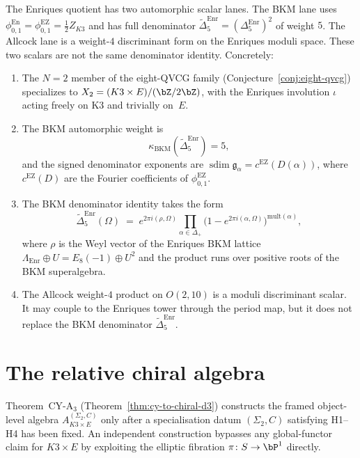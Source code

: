 \begin{conjecture}
\label{conj:enriques-qvcg}
The Enriques quotient has two automorphic scalar lanes. The BKM lane
uses
\(\phi^{\mathrm{En}}_{0,1}=\phi^{\mathrm{EZ}}_{0,1}=\frac12 Z_{K3}\)
and has full denominator
\(\widetilde\Delta^{\mathrm{Enr}}_5=(\Delta^{\mathrm{Enr}}_5)^2\) of
weight \(5\). The Allcock lane is a weight-\(4\) discriminant form on
the Enriques moduli space. These two scalars are not the same
denominator identity. Concretely:
\begin{enumerate}[label=\textup{(\roman*)}]
\item
The $N = 2$ member of the eight-QVCG family
(Conjecture~\textup{\ref{conj:eight-qvcg}}) specializes to
$X_2 = (K3 \times E)/(\bZ/2\bZ)$, with the Enriques involution
$\iota$ acting freely on K3 and trivially on~$E$.
\item
The BKM automorphic weight is
\[
 \kappa_{\mathrm{BKM}}(\widetilde\Delta^{\mathrm{Enr}}_5)=5,
\]
and the signed denominator exponents are
$\operatorname{sdim}\mathfrak g_\alpha
= c^{\mathrm{EZ}}(D(\alpha))$, where \(c^{\mathrm{EZ}}(D)\) are the
Fourier coefficients of \(\phi^{\mathrm{EZ}}_{0,1}\).
\item
The BKM denominator identity takes the form
\[
\widetilde\Delta^{\mathrm{Enr}}_5(\Omega)
\;=\;
e^{2\pi i (\rho, \Omega)}
\prod_{\alpha \in \Delta_+}
\bigl(1 - e^{2\pi i (\alpha, \Omega)}\bigr)^{\mathrm{mult}(\alpha)},
\]
where $\rho$ is the Weyl vector of the Enriques BKM lattice
$\Lambda_{\mathrm{Enr}} \oplus U = E_8(-1) \oplus U^2$ and the
product runs over positive roots of the BKM superalgebra.
\item
The Allcock weight-\(4\) product on \(O(2,10)\) is a moduli
discriminant scalar. It may couple to the Enriques tower through the
period map, but it does not replace the BKM denominator
\(\widetilde\Delta^{\mathrm{Enr}}_5\).
\end{enumerate}
\end{conjecture}


\section{The relative chiral algebra}
\label{sec:k3e-relative-chiral}

Theorem~CY-A$_3$ (Theorem~\ref{thm:cy-to-chiral-d3}) constructs the framed object-level algebra $A_{K3 \times E}^{(\Sigma_2,C)}$ only after a specialisation datum $(\Sigma_2,C)$ satisfying H1--H4 has been fixed. An independent construction bypasses any global-functor claim for $K3 \times E$ by exploiting the elliptic fibration $\pi \colon S \to \bP^1$ directly.

